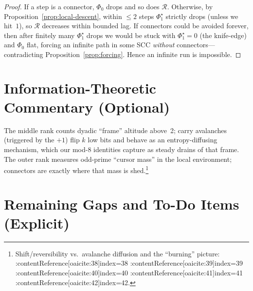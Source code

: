 \documentclass[11pt]{article}
\begin{document}
\begin{proof}
If a step is a connector, $\Phi_0$ drops and so does $\mathcal{R}$.
Otherwise, by Proposition~\ref{prop:local-descent}, within $\le 2$ steps $\Phi_1^\star$ strictly drops (unless we hit~$1$), so $\mathcal{R}$ decreases within bounded lag. If connectors could be avoided forever, then after finitely many $\Phi_1^\star$ drops we would be stuck with $\Phi_1^\star=0$ (the knife-edge) and $\Phi_0$ flat, forcing an infinite path in some SCC \emph{without} connectors---contradicting Proposition~\ref{prop:forcing}. Hence an infinite run is impossible.
\end{proof}

\section{Information-Theoretic Commentary (Optional)}
The middle rank counts dyadic ``frame'' altitude above~2; carry avalanches (triggered by the $+1$) flip $k$ low bits and behave as an entropy-diffusing mechanism, which our mod-$8$ identities capture as steady drains of that frame.
The outer rank measures odd-prime ``cursor mass'' in the local environment; connectors are exactly where that mass is shed.\footnote{Shift/reversibility vs.\ avalanche diffusion and the ``burning'' picture: :contentReference[oaicite:38]{index=38} :contentReference[oaicite:39]{index=39} :contentReference[oaicite:40]{index=40} :contentReference[oaicite:41]{index=41} :contentReference[oaicite:42]{index=42}.}

\section{Remaining Gaps and To-Do Items (Explicit)}
\end{document}

